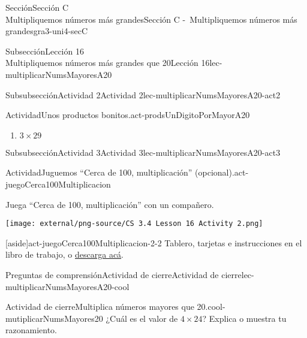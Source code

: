 \begin{sectionptx}{Sección}{{\Large Sección C\\}Multipliquemos números más grandes}{}{Sección C -~Multipliquemos números más grandes}{}{}{gra3-uni4-secC}
\begin{subsectionptx}{Subsección}{{\normalsize Lección 16\\[-0.05cm]}Multipliquemos números más grandes que 20}{}{Lección 16}{}{}{lec-multiplicarNumsMayoresA20}
\begin{subsubsectionptx}{Subsubsección}{Actividad 2}{}{Actividad 2}{}{}{lec-multiplicarNumsMayoresA20-act2}
\begin{activity}{Actividad}{Unos productos bonitos.}{act-prodsUnDigitoPorMayorA20}
\begin{enumerate}
\begin{enumerate}
\item{}\(\displaystyle 3\times 29\)%
\end{enumerate}
\end{enumerate}
\end{activity}%
\end{subsubsectionptx}
%
%
\typeout{************************************************}
\typeout{************************************************}
%
\begin{subsubsectionptx}{Subsubsección}{Actividad 3}{}{Actividad 3}{}{}{lec-multiplicarNumsMayoresA20-act3}
\begin{activity}{Actividad}{Juguemos “Cerca de 100, multiplicación” (opcional).}{act-juegoCerca100Multiplicacion}%
\begin{sidebyside}{2}{0.05}{0.05}{0.1}%
\begin{sbspanel}{0.5}%
Juega “Cerca de 100, multiplicación” con un compañero.%
\end{sbspanel}%
\begin{sbspanel}{0.3}%
\texttt{[image: external/png-source/CS 3.4 Lesson 16 Activity 2.png]}
\end{sbspanel}%
\end{sidebyside}%
\begin{aside}{[aside]}{}{act-juegoCerca100Multiplicacion-2-2}%
Tablero, tarjetas e instrucciones en el libro de trabajo, o \href{external/act-pdf/act-juegoCerca100Multiplicacion.pdf}{descarga acá}\footnotemark{}.%
\end{aside}
\end{activity}%
%
\end{subsubsectionptx}
%
%
\typeout{************************************************}
\typeout{************************************************}
%
\begin{reading-questions-subsubsection}{Preguntas de comprensión}{Actividad de cierre}{}{Actividad de cierre}{}{}{lec-multiplicarNumsMayoresA20-cool}
\begin{project}{Actividad de cierre}{Multiplica números mayores que 20.}{cool-mutiplicarNumsMayores20}%
¿Cuál es el valor de \(4\times 24\)? Explica o muestra tu razonamiento.%
\end{project}%
\end{reading-questions-subsubsection}
\end{subsectionptx}

\end{sectionptx}
